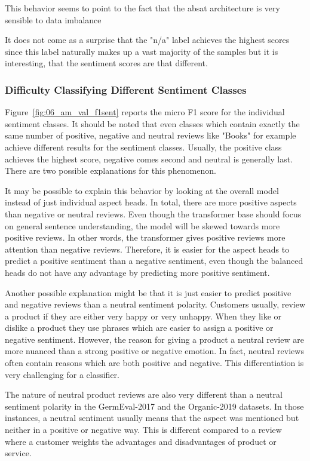 This behavior seems to point to the fact that the \gls{absat} architecture is very sensible to data imbalance


It does not come as a surprise that the "n/a" label achieves the highest scores since this label naturally makes up a vast majority of the samples but it is interesting, that the sentiment scores are that different.

\subsubsection*{Difficulty Classifying Different Sentiment Classes}

Figure~\ref{fig:06_am_val_f1sent} reports the micro F1 score for the individual sentiment classes. It should be noted that even classes which contain exactly the same number of positive, negative and neutral reviews like "Books" for example achieve different results for the sentiment classes. Usually, the positive class achieves the highest score, negative comes second and neutral is generally last. There are two possible explanations for this phenomenon.
\smallskip

It may be possible to explain this behavior by looking at the overall model instead of just individual aspect heads. In total, there are more positive aspects than negative or neutral reviews. Even though the transformer base should focus on general sentence understanding, the model will be skewed towards more positive reviews. In other words, the transformer gives positive reviews more attention than negative reviews. Therefore, it is easier for the aspect heads to predict a positive sentiment than a negative sentiment, even though the balanced heads do not have any advantage by predicting more positive sentiment.
\bigskip

Another possible explanation might be that it is just easier to predict positive and negative reviews than a neutral sentiment polarity. Customers usually, review a product if they are either very happy or very unhappy. When they like or dislike a product they use phrases which are easier to assign a positive or negative sentiment. However, the reason for giving a product a neutral review are more nuanced than a strong positive or negative emotion. In fact, neutral reviews often contain reasons which are both positive and negative. This differentiation is very challenging for a classifier. 
\smallskip

The nature of neutral product reviews are also very different than a neutral sentiment polarity in the GermEval-2017 and the Organic-2019 datasets. In those instances, a neutral sentiment usually means that the aspect was mentioned but neither in a positive or negative way. This is different compared to a review where a customer weights the advantages and disadvantages of product or service.

